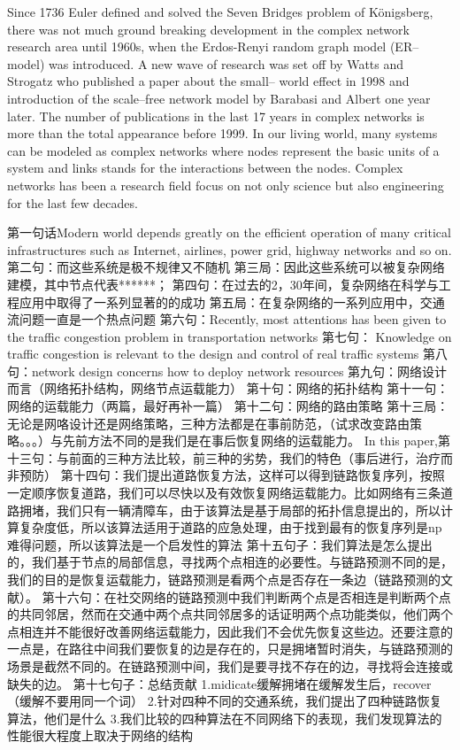 \documentclass[onecolumn,preprintnumbers,amsmath,amssymb]{revtex4}
\begin{document}
Since 1736 Euler defined and solved the Seven Bridges problem of Königsberg, there was not much ground breaking development in the complex network research area until 1960s, when the Erdos-Renyi random graph model (ER–model) was introduced. A new wave of research was set off by Watts and Strogatz who published a paper about the small– world effect in 1998 and introduction of the scale–free network model by Barabasi and Albert one year later. The number of publications in the last 17 years in complex networks is more than the total appearance before 1999. In our living world, many systems can be modeled as complex networks where nodes represent the basic units of a system and links stands for the interactions between the nodes\cite{TFWN}. Complex networks has been a research field focus on not only science but also engineering for the last few decades\cite{PSV,AEM,KIG,BTS,LZYC,HHM,RAA,SND,MEJ,SBV}.



第一句话Modern world depends greatly on the efficient operation of many critical infrastructures such as Internet, airlines, power grid, highway networks and so on\cite{TCIC}.
第二句：而这些系统是极不规律又不随机
第三局：因此这些系统可以被复杂网络建模，其中节点代表******；
第四句：在过去的2，30年间，复杂网络在科学与工程应用中取得了一系列显著的的成功
第五局：在复杂网络的一系列应用中，交通流问题一直是一个热点问题
第六句：Recently, most attentions has been given to the traffic congestion problem in transportation networks
第七句： Knowledge on traffic congestion is relevant to the design and control of real traffic systems 
第八句：network design concerns how  to deploy network resources
第九句：网络设计而言（网络拓扑结构，网络节点运载能力）
第十句：网络的拓扑结构
第十一句：网络的运载能力（两篇，最好再补一篇）
第十二句：网络的路由策略
第十三局：无论是网咯设计还是网络策略，三种方法都是在事前防范，（试求改变路由策略。。。）与先前方法不同的是我们是在事后恢复网络的运载能力。
In this paper,第十三句：与前面的三种方法比较，前三种的劣势，我们的特色（事后进行，治疗而非预防）
第十四句：我们提出道路恢复方法，这样可以得到链路恢复序列，按照一定顺序恢复道路，我们可以尽快以及有效恢复网络运载能力。比如网络有三条道路拥堵，我们只有一辆清障车，由于该算法是基于局部的拓扑信息提出的，所以计算复杂度低，所以该算法适用于道路的应急处理，由于找到最有的恢复序列是np难得问题，所以该算法是一个启发性的算法
第十五句子：我们算法是怎么提出的，我们基于节点的局部信息，寻找两个点相连的必要性。与链路预测不同的是，我们的目的是恢复运载能力，链路预测是看两个点是否存在一条边（链路预测的文献）。
第十六句：在社交网络的链路预测中我们判断两个点是否相连是判断两个点的共同邻居，然而在交通中两个点共同邻居多的话证明两个点功能类似，他们两个点相连并不能很好改善网络运载能力，因此我们不会优先恢复这些边。还要注意的一点是，在路往中间我们要恢复的边是存在的，只是拥堵暂时消失，与链路预测的场景是截然不同的。在链路预测中间，我们是要寻找不存在的边，寻找将会连接或缺失的边。
第十七句子：总结贡献
1.midicate缓解拥堵在缓解发生后，recover（缓解不要用同一个词）
2.针对四种不同的交通系统，我们提出了四种链路恢复算法，他们是什么
3.我们比较的四种算法在不同网络下的表现，我们发现算法的性能很大程度上取决于网络的结构
\end{document}
